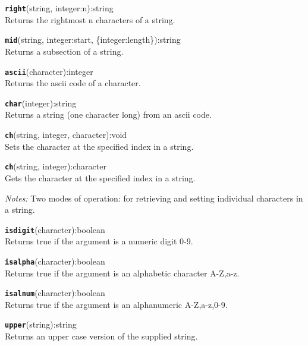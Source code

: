 \texttt{{\large\textbf{right}}}\textsf{(string, integer:n):string}\\
 Returns the rightmost n characters of a string.

\hrulefill

\texttt{{\large\textbf{mid}}}\textsf{(string, integer:start, \{integer:length\}):string}\\
 Returns a subsection of a string.

\hrulefill

\texttt{{\large\textbf{ascii}}}\textsf{(character):integer}\\
 Returns the ascii code of a character.

\hrulefill

\texttt{{\large\textbf{char}}}\textsf{(integer):string}\\
 Returns a string (one character long) from an ascii code.

\hrulefill

\texttt{{\large\textbf{ch}}}\textsf{(string, integer, character):void}\\
 Sets the character at the specified index in a string.

\texttt{{\large\textbf{ch}}}\textsf{(string, integer):character}\\
 Gets the character at the specified index in a string.

\emph{Notes:} Two modes of operation: for retrieving and setting individual characters in a string.

\hrulefill

\texttt{{\large\textbf{isdigit}}}\textsf{(character):boolean}\\
 Returns true if the argument is a numeric digit 0-9.

\hrulefill

\texttt{{\large\textbf{isalpha}}}\textsf{(character):boolean}\\
 Returns true if the argument is an alphabetic character A-Z,a-z.

\hrulefill

\texttt{{\large\textbf{isalnum}}}\textsf{(character):boolean}\\
 Returns true if the argument is an alphanumeric A-Z,a-z,0-9.

\hrulefill

\texttt{{\large\textbf{upper}}}\textsf{(string):string}\\
 Returns an upper case version of the supplied string.

\hrulefill

